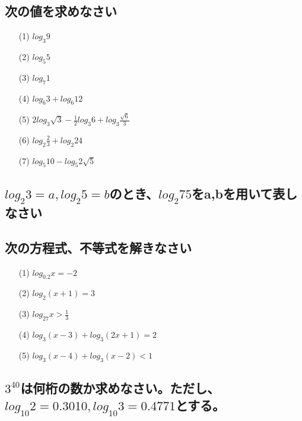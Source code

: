 \documentclass[twocolumn, 20pt]{jarticle}
\begin{document}
\subsection{次の値を求めなさい}
\begin{itemize}
  \item [(1)] $ \displaystyle log_3 9$
  \item [(2)] $\displaystyle log_5 5$
  \item [(3)] $\displaystyle log_7 1$
  \item [(4)] $\displaystyle log_6 3 + log_6 12$
  \item [(5)] $\displaystyle 2log_3 \sqrt{3} - \frac{1}{2}log_3 6 + log_3 \frac{\sqrt{6}}{3}$
  \item [(6)] $\displaystyle log_2 \frac{2}{3} + log_2 24$
  \item [(7)] $\displaystyle log_5 10 - log_5 2\sqrt{5}$
\end{itemize}

\subsection{$log_2 3 =a, log_2 5 = b$のとき、$\displaystyle log_2 75$をa,bを用いて表しなさい}
\subsection{次の方程式、不等式を解きなさい}
\begin{itemize}
  \item [(1)] $ \displaystyle log_{0.2}x=-2$
  \item [(2)] $\displaystyle log_2 (x+1)=3$
  \item [(3)] $\displaystyle log_{27}x>\frac{1}{3}$
  \item [(4)] $\displaystyle log_3(x-3)+log_3(2x+1)=2$
  \item [(5)] $\displaystyle log_3(x-4)+log_3 (x-2)<1$
\end{itemize}

\subsection{$3^{40}$は何桁の数か求めなさい。ただし、$log_10 2 =0.3010,log_10 3 = 0.4771$とする。}
\end{document}
